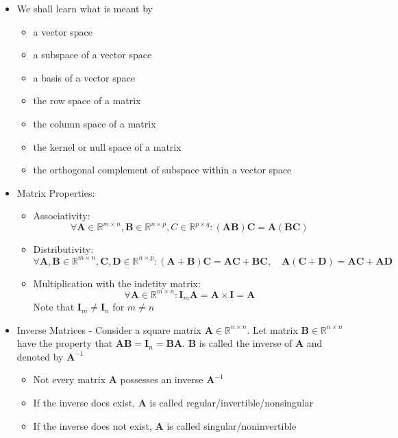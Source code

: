 \documentclass{article}
\begin{document}
\begin{itemize}
\begin{itemize}
    \end{itemize}
    \item We shall learn what is meant by
    \begin{itemize}
        \item a vector space
        \item a subspace of a vector space
        \item a basis of a vector space
        \item the row space of a matrix
        \item the column space of a matrix
        \item the kernel or null space of a matrix
        \item the orthogonal complement of subspace within a vector space
    \end{itemize}
    \item Matrix Properties:
    \begin{itemize}
        \item Associativity:
        \[
        \forall \bm{A} \in \mathbb{R}^{m \times n}, \bm{B} \in \mathbb{R}^{n \times p}, C \in \mathbb{R}^{p \times q}: (\bm{A} \bm{B}) \bm{C} = \bm{A} (\bm{B} \bm{C})
        \]
        \item Distributivity:
        \[
        \forall \bm{A}, \bm{B} \in \mathbb{R}^{m \times n}, \bm{C}, \bm{D} \in \mathbb{R}^{n \times p}: (\bm{A} + \bm{B}) \bm{C} = \bm{A} \bm{C} + \bm{B} \bm{C}, \quad \bm{A} (\bm{C} + \bm{D}) = \bm{A} \bm{C} + \bm{A} \bm{D}
        \]
        \item Multiplication with the indetity matrix:
        \[
        \forall \bm{A} \in \mathbb{R}^{m \times n}: \bm{I}_m \bm{A} = \bm
        {A} \times \bm{I} = \bm{A}
        \]
        Note that $\bm{I}_m \neq \bm{I}_n$ for $m \neq n$
    \end{itemize}
    \item Inverse Matrices - Consider a square matrix $\bm{A} \in \mathbb{R}^{n \times n}$. Let matrix $\bm{B} \in \mathbb{R}^{n \times n}$ have the property that $\bm{A} \bm{B} = \bm{I}_n = \bm{B} \bm{A}$. $\bm{B}$ is called the inverse of $\bm{A}$ and denoted by $\bm{A}^{-1}$
    \begin{itemize}
        \item Not every matrix $\bm{A}$ possesses an inverse $\bm{A}^{-1}$
        \item If the inverse does exist, $\bm{A}$ is called regular/invertible/nonsingular
        \item If the inverse does not exist, $\bm{A}$ is called singular/noninvertible

\end{itemize}
\end{itemize}
\end{document}

